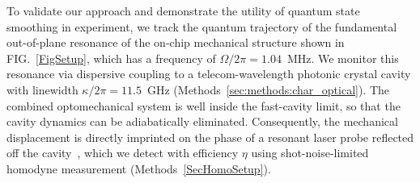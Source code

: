 \documentclass[aps,prx,twocolumn,amsmath,amssymb,superscriptaddress,floatfix,longbibliography
]{revtex4-2}
\begin{document}
To validate our approach and demonstrate the utility of quantum state smoothing in experiment, 
we track the quantum trajectory of the fundamental out-of-plane resonance of
the on-chip mechanical structure shown in FIG.~\ref{FigSetup}, which has a frequency of $\Omega/2\pi = 1.04$~MHz. 
We monitor this resonance via dispersive coupling to a telecom-wavelength photonic crystal cavity with linewidth $\kappa/2\pi=11.5$~GHz (Methods~\ref{sec:methods:char_optical}).
The combined optomechanical system is well inside the fast-cavity limit, so that the cavity dynamics can be adiabatically eliminated.
Consequently, the mechanical displacement is directly imprinted on the phase of a resonant laser probe reflected off the cavity~\cite{bowen2015quantum}, which we detect with efficiency $\eta$ using shot-noise-limited homodyne measurement (Methods~\ref{SecHomoSetup}).
\end{document}
